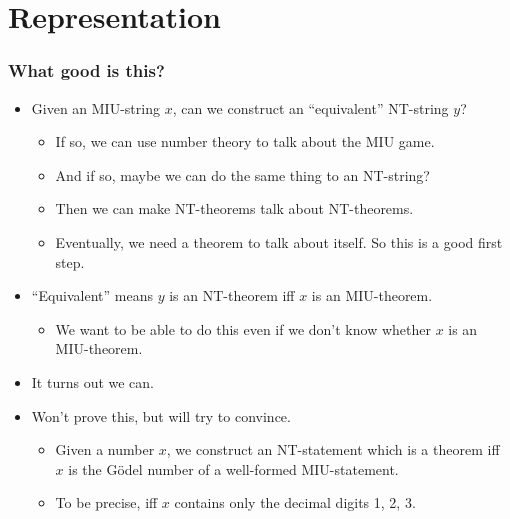 \documentclass[mathserif]{beamer}
\begin{document}
\section{Representation}
\label{sec-4}
\begin{frame}
\frametitle{What good is this?}
\label{sec-4-1}

\pause
\begin{itemize}

\item Given an MIU-string $x$, can we construct an ``equivalent'' NT-string $y$?\pause
\label{sec-4-1-1}%
\begin{itemize}

\item If so, we can use number theory to talk about the MIU game.\pause\\
\label{sec-4-1-1-1}%
\item And if so, maybe we can do the same thing to an NT-string?\pause\\
\label{sec-4-1-1-2}%
\item Then we can make NT-theorems talk about NT-theorems.\pause\\
\label{sec-4-1-1-3}%
\item Eventually, we need a theorem to talk about itself. So this is a good first step.\pause\\
\label{sec-4-1-1-4}%
\end{itemize} %

\item ``Equivalent'' means $y$ is an NT-theorem iff $x$ is an MIU-theorem.\pause
\label{sec-4-1-2}%
\begin{itemize}

\item We want to be able to do this even if we don't know whether $x$ is an MIU-theorem.\pause\\
\label{sec-4-1-2-1}%
\end{itemize} %

\item It turns out we can.\pause\\
\label{sec-4-1-3}%
\item Won't prove this, but will try to convince.\pause
\label{sec-4-1-4}%
\begin{itemize}

\item Given a number $x$, we construct an NT-statement which is a theorem iff $x$ is the Gödel number of a well-formed MIU-statement.\pause\\
\label{sec-4-1-4-1}%
\item To be precise, iff $x$ contains only the decimal digits 1, 2, 3.\\
\label{sec-4-1-4-2}%
\end{itemize} %
\end{itemize} %
\end{frame}
\end{document}
